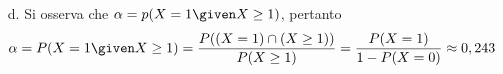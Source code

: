 \documentclass{subfiles}
\begin{document}
\begin{Example*}
\begin{enumerate}
        \item [d.] Si osserva che \(\alpha = p(X = 1 \given X \ge 1)\), pertanto
              \[
                  \alpha = P(X = 1 \given X \ge 1) = \frac{P((X = 1) \cap (X \ge 1))}{P(X \ge 1)} = \frac{P(X = 1)}{1 - P(X = 0)} \approx 0,243
              \]
    \end{enumerate}
\end{Example*}
\end{document}
